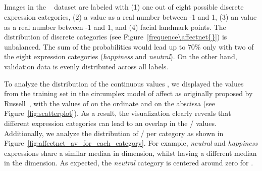 \subsection{\affectnet{}}

Images in the \affectnet{}~\cite{mollahosseini2017affectnet} dataset are labeled with (1) one out of eight possible discrete expression categories, (2) a \val{} value as a real number between -1 and 1, (3) an \aro{} value as a real number between -1 and 1, and (4) facial landmark points. The distribution of discrete categories (see Figure~\ref{frequence\affectnet{}}) is unbalanced. %
The sum of the probabilities would lead up to 70\% only with two of the eight expression categories (\textit{happiness} and \textit{neutral}). On the other hand, validation data is evenly distributed across all labels.





To analyze the distribution of the continuous values \va{}, we displayed the values from the training set in the circumplex model of affect as originally proposed by Russell~\cite{rusellmodell}, with the values of \aro{} on the ordinate and \val{} on the abscissa (see Figure~\ref{fig:scatterplot}). As a result, the visualization clearly reveals that different expression categories can lead to an overlap in the \val{}/\aro{} values. Additionally, we analyze the distribution of \val{}/\aro{} per category as shown in  Figure~\ref{fig:affectnet_av_for_each_category}. For example, \textit{neutral} and \textit{happiness} expressions share a similar median in \aro{} dimension, whilst having a different median in the \val{} dimension. As expected, the \textit{neutral} category is centered around zero for \va{}. 


%


